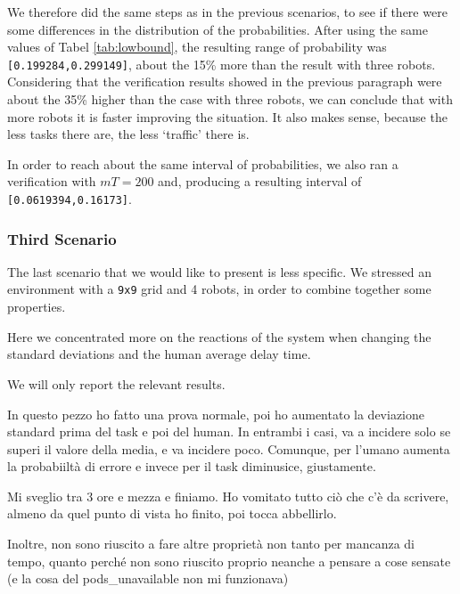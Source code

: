 We therefore did the same steps as in the previous scenarios, to see if there were some differences in the distribution of the probabilities. After using the same values of Tabel \ref{tab:lowbound}, the resulting range of probability was \texttt{[0.199284,0.299149]}, about the 15\% more than the result with three robots. Considering that the verification results showed in the previous paragraph were about the 35\% higher than the case with three robots, we can conclude that with more robots it is faster improving the situation. It also makes sense, because the less tasks there are, the less `traffic' there is.

In order to reach about the same interval of probabilities, we also ran a verification with $mT = 200$ and, producing a resulting interval of \\ \texttt{[0.0619394,0.16173]}.

\subsubsection{Third Scenario}
The last scenario that we would like to present is less specific. We stressed an environment with a \texttt{9x9} grid and 4 robots, in order to combine together some properties.

Here we concentrated more on the reactions of the system when changing the standard deviations and the human average delay time.

We will only report the relevant results.

In questo pezzo ho fatto una prova normale, poi ho aumentato la deviazione standard prima del task e poi del human. In entrambi i casi, va a incidere solo se superi il valore della media, e va incidere poco. Comunque, per l'umano aumenta la probabiiltà di errore e invece per il task diminusice, giustamente.

Mi sveglio tra 3 ore e mezza e finiamo. Ho vomitato tutto ciò che c'è da scrivere, almeno da quel punto di vista ho finito, poi tocca abbellirlo.

Inoltre, non sono riuscito a fare altre proprietà non tanto per mancanza di tempo, quanto perché non sono riuscito proprio neanche a pensare a cose sensate (e la cosa del pods\_unavailable non mi funzionava)